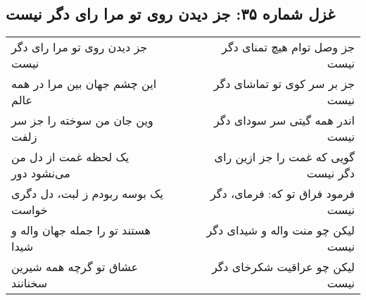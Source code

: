 \begin{center}
\section*{غزل شماره ۳۵: جز دیدن روی تو مرا رای دگر نیست}
\label{sec:035}
\begin{longtable}{l p{0.5cm} r}
جز دیدن روی تو مرا رای دگر نیست
&&
جز وصل توام هیچ تمنای دگر نیست
\\
این چشم جهان بین مرا در همه عالم
&&
جز بر سر کوی تو تماشای دگر نیست
\\
وین جان من سوخته را جز سر زلفت
&&
اندر همه گیتی سر سودای دگر نیست
\\
یک لحظه غمت از دل من می‌نشود دور
&&
گویی که غمت را جز ازین رای دگر نیست
\\
یک بوسه ربودم ز لبت، دل دگری خواست
&&
فرمود فراق تو که: فرمای، دگر نیست
\\
هستند تو را جمله جهان واله و شیدا
&&
لیکن چو منت واله و شیدای دگر نیست
\\
عشاق تو گرچه همه شیرین سخنانند
&&
لیکن چو عراقیت شکرخای دگر نیست
\\
\end{longtable}
\end{center}
